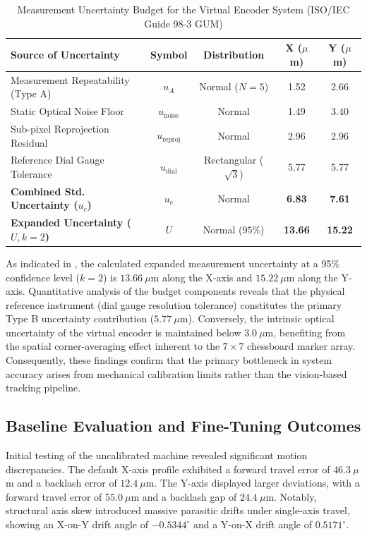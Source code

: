 \begin{table}[tbp]
	\centering
	\caption{Measurement Uncertainty Budget for the Virtual Encoder System (ISO/IEC Guide 98-3 GUM)}
	\label{tab:uncertainty_budget}
	\scriptsize
	\setlength{\tabcolsep}{2.5pt}
	\renewcommand{\arraystretch}{1.2}
	
	\begin{tabularx}{\linewidth}{@{} L c c c c @{}}
		\toprule
		\textbf{Source of Uncertainty} & \textbf{Symbol} & \textbf{Distribution} & \textbf{X ($\mu$m)} & \textbf{Y ($\mu$m)} \\ 
		\midrule
		Measurement Repeatability (Type A) & $u_A$ & Normal ($N=5$) & 1.52 & 2.66 \\
		Static Optical Noise Floor & $u_{\text{noise}}$ & Normal & 1.49 & 3.40 \\
		Sub-pixel Reprojection Residual & $u_{\text{reproj}}$ & Normal & 2.96 & 2.96 \\
		Reference Dial Gauge Tolerance & $u_{\text{dial}}$ & Rectangular ($\sqrt{3}$) & 5.77 & 5.77 \\ 
		\midrule
		\textbf{Combined Std. Uncertainty ($u_c$)} & $u_c$ & Normal & \textbf{6.83} & \textbf{7.61} \\
		\textbf{Expanded Uncertainty ($U, k=2$)} & $U$ & Normal ($95\%$) & \textbf{13.66} & \textbf{15.22} \\ 
		\bottomrule
	\end{tabularx}
\end{table}

As indicated in , the calculated expanded measurement uncertainty at a 95\% confidence level ($k=2$) is $13.66~\mu\text{m}$ along the X-axis and $15.22~\mu\text{m}$ along the Y-axis. Quantitative analysis of the budget components reveals that the physical reference instrument (dial gauge resolution tolerance) constitutes the primary Type B uncertainty contribution ($5.77~\mu\text{m}$). Conversely, the intrinsic optical uncertainty of the virtual encoder is maintained below $3.0~\mu\text{m}$, benefiting from the spatial corner-averaging effect inherent to the $7 \times 7$ chessboard marker array. Consequently, these findings confirm that the primary bottleneck in system accuracy arises from mechanical calibration limits rather than the vision-based tracking pipeline.

\subsection{Baseline Evaluation and Fine-Tuning Outcomes}
Initial testing of the uncalibrated machine revealed significant motion discrepancies. The default X-axis profile exhibited a forward travel error of $46.3~\mu$m and a backlash error of $12.4~\mu$m. The Y-axis displayed larger deviations, with a forward travel error of $55.0~\mu$m and a backlash gap of $24.4~\mu$m. Notably, structural axis skew introduced massive parasitic drifts under single-axis travel, showing an X-on-Y drift angle of $-0.5344^\circ$ and a Y-on-X drift angle of $0.5171^\circ$.

